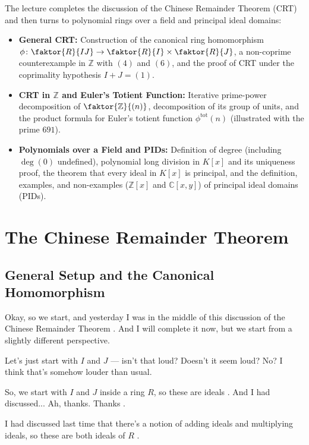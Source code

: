 \begin{overview}
The lecture completes the discussion of the Chinese Remainder Theorem (CRT) and then turns to polynomial rings over a field and principal ideal domains:
\begin{itemize}
    \item \textbf{General CRT:} Construction of the canonical ring homomorphism $\phi \colon \faktor{R}{IJ} \to \faktor{R}{I} \times \faktor{R}{J}$, a non-coprime counterexample in $\mathbb{Z}$ with $(4)$ and $(6)$, and the proof of CRT under the coprimality hypothesis $I + J = (1)$.
    \item \textbf{CRT in $\mathbb{Z}$ and Euler's Totient Function:} Iterative prime-power decomposition of $\faktor{\mathbb{Z}}{(n)}$, decomposition of its group of units, and the product formula for Euler's totient function $\phi^{\text{tot}}(n)$ (illustrated with the prime $691$).
    \item \textbf{Polynomials over a Field and PIDs:} Definition of degree (including $\deg(0)$ undefined), polynomial long division in $K[x]$ and its uniqueness proof, the theorem that every ideal in $K[x]$ is principal, and the definition, examples, and non-examples ($\mathbb{Z}[x]$ and $\mathbb{C}[x, y]$) of principal ideal domains (PIDs).
\end{itemize}
\end{overview}

\section{The Chinese Remainder Theorem}

\subsection{General Setup and the Canonical Homomorphism}

\begin{speech}[00:00:00 - 00:01:00]
Okay, so we start, and yesterday I was in the middle of this discussion of the Chinese Remainder Theorem . And I will complete it now, but we start from a slightly different perspective.

Let's just start with $I$ and $J$  --- isn't that loud? Doesn't it seem loud? No? I think that's somehow louder than usual.

So, we start with $I$ and $J$ inside a ring $R$, so these are ideals . And I had discussed... Ah, thanks. Thanks .

I had discussed last time that there's a notion of adding ideals and multiplying ideals, so these are both ideals of $R$ .
\end{speech}

